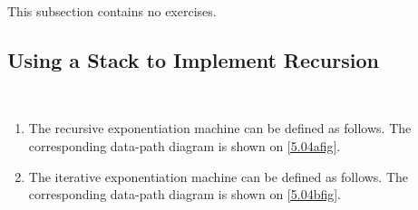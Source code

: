 This subsection contains no exercises.

\subsection{Using a Stack to Implement Recursion}

\begin{exe}[5.4]
    \label{5.04}
    \ \vspace{-20pt}
    \begin{enumerate}
	\item The recursive exponentiation machine can be defined as follows. 
	    The corresponding data-path diagram is shown on \autoref{5.04afig}.
	\item The iterative exponentiation machine can be defined as follows. 
	    The corresponding data-path diagram is shown on \autoref{5.04bfig}.
    \end{enumerate}

    \begin{figure}
        \centering
\end{figure}
\end{exe}
